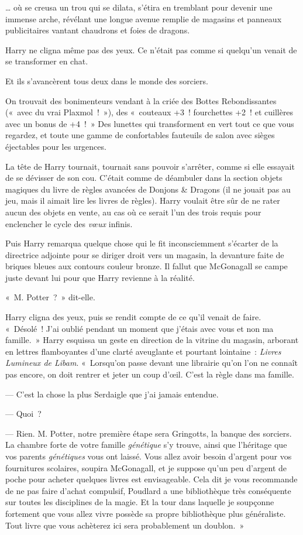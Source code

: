 … où se creusa un trou qui se dilata, s'étira en tremblant pour devenir une immense arche, révélant une longue avenue remplie de magasins et panneaux publicitaires vantant chaudrons et foies de dragons.

Harry ne cligna même pas des yeux. Ce n'était pas comme si quelqu'un venait de se transformer en chat.

Et ils s'avancèrent tous deux dans le monde des sorciers.

On trouvait des bonimenteurs vendant à la criée des Bottes Rebondissantes («~avec du vrai Plaxmol~!~»), des «~couteaux +3~!  fourchettes +2~! et cuillères avec un bonus de +4~!~» Des lunettes qui transforment en vert tout ce que vous regardez, et toute une gamme de confortables fauteuils de salon avec sièges éjectables pour les urgences.

La tête de Harry tournait, tournait sans pouvoir s'arrêter, comme si elle essayait de se dévisser de son cou. C'était comme de déambuler dans la section objets magiques du livre de règles avancées de Donjons \& Dragons (il ne jouait pas au jeu, mais il aimait lire les livres de règles). Harry voulait être sûr de ne rater aucun des objets en vente, au cas où ce serait l'un des trois requis pour enclencher le cycle des \emph{vœux} infinis.

Puis Harry remarqua quelque chose qui le fit inconsciemment s'écarter de la directrice adjointe pour se diriger droit vers un magasin, la devanture faite de briques bleues aux contours couleur bronze. Il fallut que McGonagall se campe juste devant lui pour que Harry revienne à la réalité.

«~M. Potter~?~» dit-elle.

Harry cligna des yeux, puis se rendit compte de ce qu'il venait de faire. «~Désolé~! J'ai oublié pendant un moment que j'étais avec vous et non ma famille.~» Harry esquissa un geste en direction de la vitrine du magasin, arborant en lettres flamboyantes d'une clarté aveuglante et pourtant lointaine~: \emph{Livres Lumineux de Libam}. «~Lorsqu'on passe devant une librairie qu'on l'on ne connaît pas encore, on doit rentrer et jeter un coup d'œil. C'est la règle dans ma famille.

--- C'est la chose la plus Serdaigle que j'ai jamais entendue.

--- Quoi~?

--- Rien. M. Potter, notre première étape sera Gringotts, la banque des sorciers. La chambre forte de votre famille \emph{génétique} s'y trouve, ainsi que l'héritage que vos parents \emph{génétiques} vous ont laissé. Vous allez avoir besoin d'argent pour vos fournitures scolaires, soupira McGonagall, et je suppose qu'un peu d'argent de poche pour acheter quelques livres est envisageable. Cela dit je vous recommande de ne pas faire d'achat compulsif, Poudlard a une bibliothèque très conséquente sur toutes les disciplines de la magie. Et la tour dans laquelle je soupçonne fortement que vous allez vivre possède sa propre bibliothèque plus généraliste. Tout livre que vous achèterez ici sera probablement un doublon.~»

